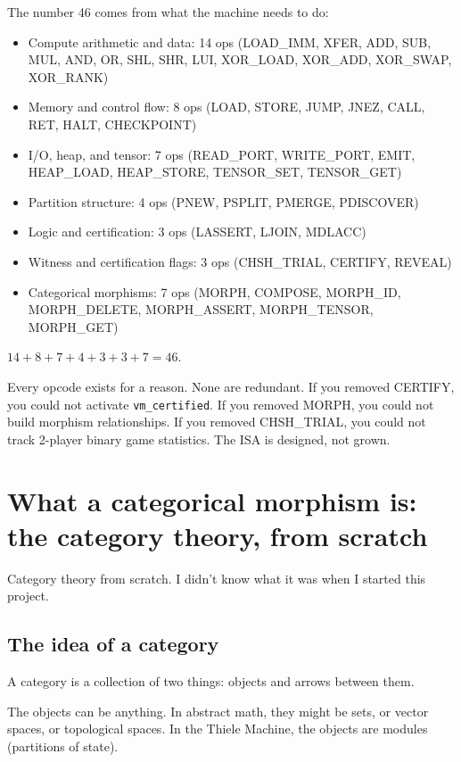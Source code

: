 \documentclass[11pt,a4paper]{article}
\theoremstyle{plain}
\theoremstyle{definition}
\theoremstyle{remark}
\begin{document}
The number 46 comes from what the machine needs to do:
\begin{itemize}
\item Compute arithmetic and data: 14 ops (LOAD\_IMM, XFER, ADD, SUB, MUL, AND, OR, SHL, SHR, LUI, XOR\_LOAD, XOR\_ADD, XOR\_SWAP, XOR\_RANK)
\item Memory and control flow: 8 ops (LOAD, STORE, JUMP, JNEZ, CALL, RET, HALT, CHECKPOINT)
\item I/O, heap, and tensor: 7 ops (READ\_PORT, WRITE\_PORT, EMIT, HEAP\_LOAD, HEAP\_STORE, TENSOR\_SET, TENSOR\_GET)
\item Partition structure: 4 ops (PNEW, PSPLIT, PMERGE, PDISCOVER)
\item Logic and certification: 3 ops (LASSERT, LJOIN, MDLACC)
\item Witness and certification flags: 3 ops (CHSH\_TRIAL, CERTIFY, REVEAL)
\item Categorical morphisms: 7 ops (MORPH, COMPOSE, MORPH\_ID, MORPH\_DELETE, MORPH\_ASSERT, MORPH\_TENSOR, MORPH\_GET)
\end{itemize}

$14 + 8 + 7 + 4 + 3 + 3 + 7 = 46$.

Every opcode exists for a reason. None are redundant. If you removed CERTIFY, you could not activate \texttt{vm\_certified}. If you removed MORPH, you could not build morphism relationships. If you removed CHSH\_TRIAL, you could not track 2-player binary game statistics. The ISA is designed, not grown.

\section{What a categorical morphism is: the category theory, from scratch}
\label{sec:category}

Category theory from scratch. I didn't know what it was when I started this project.

\subsection{The idea of a category}

A category is a collection of two things: objects and arrows between them.

The objects can be anything. In abstract math, they might be sets, or vector spaces, or topological spaces. In the Thiele Machine, the objects are modules (partitions of state).
\end{document}

